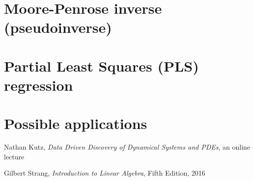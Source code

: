 \documentclass[10pt,twocolumn]{article}
\begin{document}
\section{Moore-Penrose inverse (pseudoinverse)}




\section{Partial Least Squares (PLS) regression}


\section{Possible applications}


\newpage


\thebibliography{}

 Nathan Kutz, \textit{Data Driven Discovery of Dynamical Systems and PDEs}, an online lecture 

 Gilbert Strang, \textit{Introduction to Linear Algebra}, Fifth Edition, 2016

 \label{bib:pope}
\end{document}
